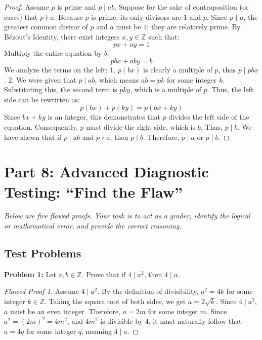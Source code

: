 \documentclass[11pt]{article}
\theoremstyle{definition}
\theoremstyle{remark}
\begin{document}
\begin{proof}
Assume $p$ is prime and $p \mid ab$. Suppose for the sake of contraposition (or cases) that $p \nmid a$. Because $p$ is prime, its only divisors are $1$ and $p$. Since $p \nmid a$, the greatest common divisor of $p$ and $a$ must be $1$; they are relatively prime.
By B\'{e}zout's Identity, there exist integers $x, y \in \mathbb{Z}$ such that:
\[ px + ay = 1 \]
Multiply the entire equation by $b$:
\[ pbx + aby = b \]
We analyze the terms on the left:
1. $p(bx)$ is clearly a multiple of $p$, thus $p \mid pbx$.
2. We were given that $p \mid ab$, which means $ab = pk$ for some integer $k$. Substituting this, the second term is $pky$, which is a multiple of $p$.
Thus, the left side can be rewritten as:
\[ p(bx) + p(ky) = p(bx + ky) \]
Since $bx + ky$ is an integer, this demonstrates that $p$ divides the left side of the equation. Consequently, $p$ must divide the right side, which is $b$. Thus, $p \mid b$.
We have shown that if $p \mid ab$ and $p \nmid a$, then $p \mid b$. Therefore, $p \mid a$ or $p \mid b$.
\end{proof}

\vspace{2em}

\section{Part 8: Advanced Diagnostic Testing: ``Find the Flaw''}
\textit{Below are five flawed proofs. Your task is to act as a grader, identify the logical or mathematical error, and provide the correct reasoning.}

\subsection{Test Problems}

\textbf{Problem 1:} Let $a, b \in \mathbb{Z}$. Prove that if $4 \mid a^2$, then $4 \mid a$.
\begin{proof}[Flawed Proof 1]
Assume $4 \mid a^2$. By the definition of divisibility, $a^2 = 4k$ for some integer $k \in \mathbb{Z}$.
Taking the square root of both sides, we get $a = 2\sqrt{k}$.
Since $4 \mid a^2$, $a$ must be an even integer. Therefore, $a = 2m$ for some integer $m$. 
Since $a^2 = (2m)^2 = 4m^2$, and $4m^2$ is divisible by $4$, it must naturally follow that $a = 4q$ for some integer $q$, meaning $4 \mid a$.
\end{proof}
\end{document}
